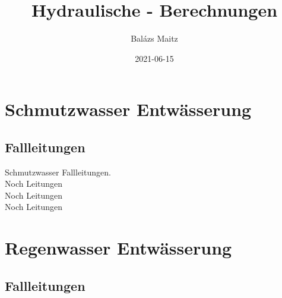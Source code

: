 \documentclass[12pt]{report}
\author{Balázs Maitz} %
\title{Hydraulische - Berechnungen} %
\date{2021-06-15} %
\begin{document}
\maketitle
\tableofcontents


\pagebreak


\section{Schmutzwasser Entwässerung}
\subsection{Fallleitungen}

Schmutzwasser Fallleitungen.\\
Noch Leitungen\\
Noch Leitungen\\
Noch Leitungen\\

\pagebreak



\section{Regenwasser Entwässerung}
\subsection{Fallleitungen}
\end{document}
